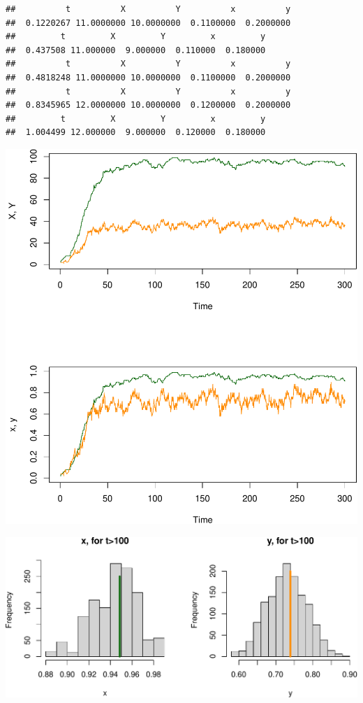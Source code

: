 \documentclass[
]{book}
\begin{document}
\begin{verbatim}
##          t          X          Y          x          y 
##  0.1220267 11.0000000 10.0000000  0.1100000  0.2000000 
##         t         X         Y         x         y 
##  0.437508 11.000000  9.000000  0.110000  0.180000 
##          t          X          Y          x          y 
##  0.4818248 11.0000000 10.0000000  0.1100000  0.2000000 
##          t          X          Y          x          y 
##  0.8345965 12.0000000 10.0000000  0.1200000  0.2000000 
##         t         X         Y         x         y 
##  1.004499 12.000000  9.000000  0.120000  0.180000
\end{verbatim}

\includegraphics{docs/figs/unnamed-chunk-58-1.pdf}

\includegraphics{docs/figs/unnamed-chunk-59-1.pdf}
\end{document}
